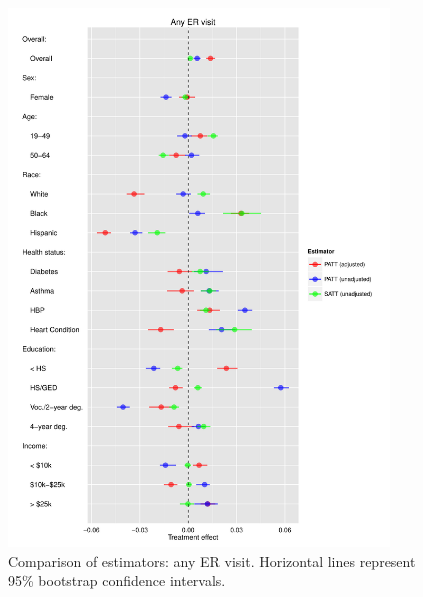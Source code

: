 \documentclass[12pt]{article}
\begin{document}
\begin{appendices}
\begin{figure}[htbp]
\begin{center}
\includegraphics[width = 0.9\textwidth]{any-visit-plot.pdf}
    \caption{Comparison of estimators: any ER visit. Horizontal lines represent 95\% bootstrap confidence intervals.}
    \label{fig:any-visit-plot}
\end{center}
\end{figure}


\end{appendices}
\end{document}
